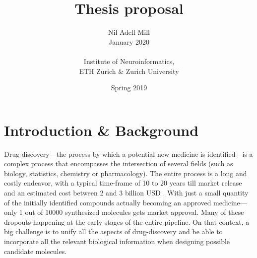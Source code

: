 \documentclass{article}
\begin{document}
\title{\Large Thesis proposal}
\author{Nil Adell Mill \\
        January 2020 \\ \\
        Institute of Neuroinformatics, \\
        ETH Zurich \& Zurich University}
\date{Spring 2019}

\maketitle

    \section*{Introduction \& Background}  

Drug discovery---the process by which a potential new medicine is identified---is a
 complex process that encompasses the intersection of several fields (such as biology,
 statistics, chemistry or pharmacology). The entire process is a long and costly
 endeavor, with a typical time-frame of 10 to 20 years till market release and an
 estimated cost between 2 and 3 billion USD \cite{Schneider2019, Scannell2012}. With
 just a small quantity of the initially identified compounds actually becoming an
 approved medicine—only 1 out of 10000 synthesized molecules gets market approval. Many
 of these dropouts happening at the early stages of the entire pipeline. On that
 context, a big challenge is to unify all the aspects of drug-discovery and be able to
 incorporate all the relevant biological information when designing possible candidate
 molecules.





\end{document}

